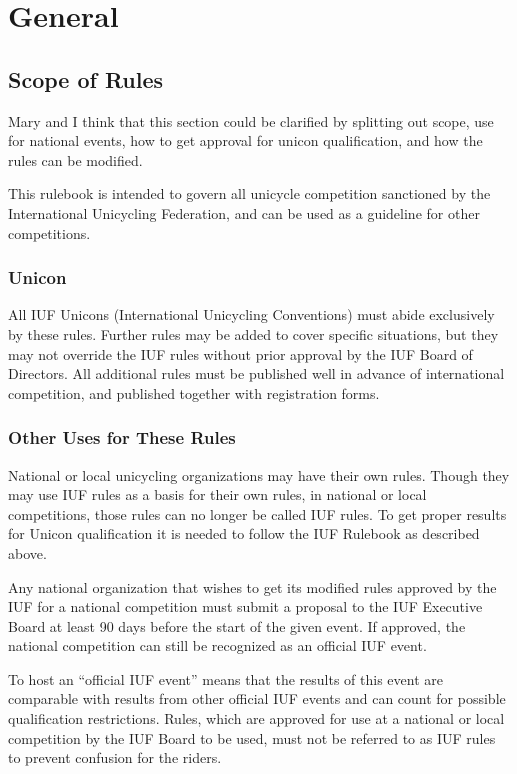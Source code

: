 \chapter{General}

\section{Scope of Rules}

\begin{comment2016}
Mary and I think that this section could be clarified by splitting out scope, use for national events, how to get approval for unicon qualification, and how the rules can be modified.
\end{comment2016}

This rulebook is intended to govern all unicycle competition sanctioned by the International Unicycling Federation, and can be used as a guideline for other competitions.

\subsection{Unicon}

All IUF Unicons (International Unicycling Conventions) must abide exclusively by these rules.
Further rules may be added to cover specific situations, but they may not override the IUF rules without prior approval by the IUF Board of Directors.
All additional rules must be published well in advance of international competition, and published together with registration forms.

\subsection{Other Uses for These Rules}

National or local unicycling organizations may have their own rules.
Though they may use IUF rules as a basis for their own rules, in national or local competitions, those rules can no longer be called IUF rules.
To get proper results for Unicon qualification it is needed to follow the IUF Rulebook as described above.

Any national organization that wishes to get its modified rules approved by the IUF for a national competition must submit a proposal to the IUF Executive Board at least 90 days before the start of the given event.
If approved, the national competition can still be recognized as an official IUF event.

To host an ``official IUF event'' means that the results of this event are comparable with results from other official IUF events and can count for possible qualification restrictions.
Rules, which are approved for use at a national or local competition by the IUF Board to be used, must not be referred to as IUF rules to prevent confusion for the riders.

